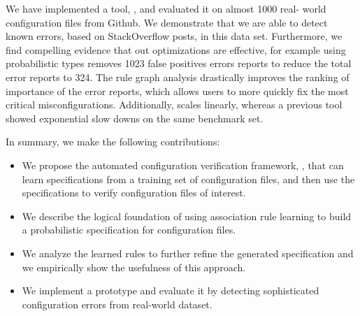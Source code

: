 We have implemented a tool, \app, and evaluated it on almost 1000 real-
world configuration files from Github.
We demonstrate that we are able to detect known errors, based on 
StackOverflow posts, in this data set.
Furthermore, we find compelling evidence that out optimizations are 
effective, for example using probabilistic types removes 1023 false 
positives errors reports to reduce the total error reports to 324.
The rule graph analysis drastically improves the ranking of importance of 
the error reports, which allows users to more quickly fix the most 
critical misconfigurations.
Additionally, \app scales linearly, whereas 
a previous tool~\cite{santolucitoCAV} showed exponential slow downs on 
the same benchmark set.

In summary, we make the following contributions:
\begin{itemize}
\item We propose the automated configuration verification
framework, \app, that can learn specifications from a training set
of configuration files, and then use the specifications to verify 
configuration files of interest.
\item We describe the logical foundation of using association rule learning to build a probabilistic specification for configuration files. 
\item We analyze the learned rules to further refine the generated specification and we empirically show the usefulness of this approach.
\item We implement a \app prototype and evaluate it by
detecting sophisticated configuration errors 
from real-world dataset.

\end{itemize}


